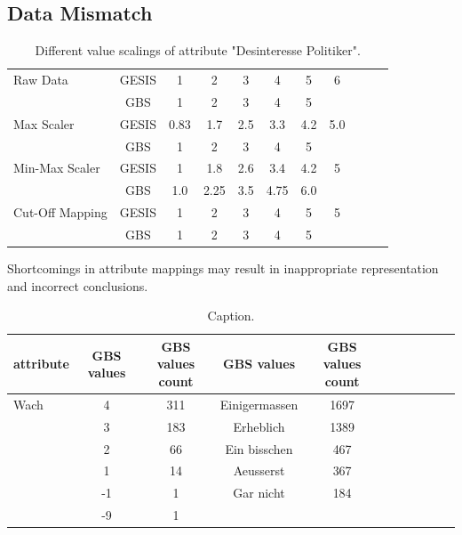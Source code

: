 \subsection{Data Mismatch}

\begin{table}[ht]
    \begin{center}
            {\footnotesize
            \begin{tabular}{l|c|ccccccccc}
                \hline \hline
		Raw Data & GESIS & 1 & 2 & 3 & 4 & 5 & 6 \\
                     & GBS & 1 & 2 & 3 & 4 & 5 & \\
                \hline
		Max Scaler & GESIS & 0.83 & 1.7 & 2.5 & 3.3 & 4.2 & 5.0 \\
                     & GBS & 1 & 2 & 3 & 4 & 5 & \\
                \hline
		Min-Max Scaler & GESIS & 1 & 1.8 & 2.6 & 3.4 & 4.2 & 5 \\
                     & GBS & 1.0 & 2.25 & 3.5 & 4.75 & 6.0 & \\
                \hline
		Cut-Off Mapping & GESIS & 1 & 2 & 3 & 4 & 5 & 5 \\
                     & GBS & 1 & 2 & 3 & 4 & 5 & \\
\hline \hline
            \end{tabular}}
        \caption{Different value scalings of attribute "Desinteresse Politiker".}
\label{Tab:DescripStatsRawData}
\end{center}
\end{table}

Shortcomings in attribute mappings may result in inappropriate representation and incorrect conclusions.

\begin{table}[ht]
    \begin{center}
            {\footnotesize
            \begin{tabular}{l|c|ccccccccc}
                \hline \hline
		attribute & GBS values & GBS values count &  GBS values & GBS values count \\
                \hline \hline
                     Wach & 4 & 311 & Einigermassen & 1697 \\
                     & 3 & 183 & Erheblich & 1389 \\
                     & 2 & 66 & Ein bisschen & 467 \\ 
              	& 1 & 14 & Aeusserst & 367 \\	
		& -1 & 1 & Gar nicht & 184 \\		
		& -9 & 1 & & \\
	     \hline \hline
            \end{tabular}}
        \caption{Caption.}
\end{center}
\end{table}



